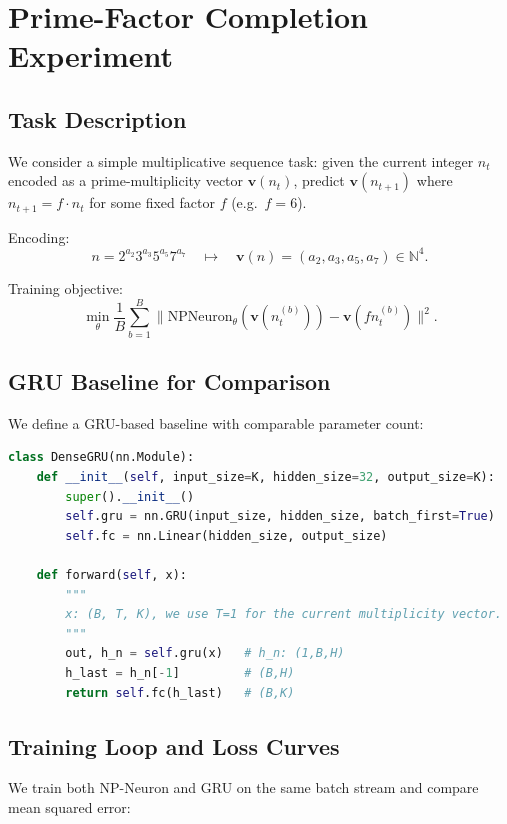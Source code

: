 \documentclass[11pt]{article}
\begin{document}
\section{Prime-Factor Completion Experiment}

\subsection{Task Description}

We consider a simple multiplicative sequence task: given the current integer \(n_t\) encoded as a prime-multiplicity vector \(\mathbf{v}(n_t)\), predict \(\mathbf{v}(n_{t+1})\) where \(n_{t+1} = f \cdot n_t\) for some fixed factor \(f\) (e.g.\ \(f=6\)).

Encoding:
\[
n = 2^{a_2} 3^{a_3} 5^{a_5} 7^{a_7}
\quad\longmapsto\quad
\mathbf{v}(n) = (a_2,a_3,a_5,a_7) \in \mathbb{N}^4.
\]

Training objective:
\[
\min_\theta \frac{1}{B}\sum_{b=1}^B
\| \mathrm{NPNeuron}_\theta(\mathbf{v}(n_t^{(b)})) - \mathbf{v}(f n_t^{(b)})\|^2.
\]

\subsection{GRU Baseline for Comparison}

We define a GRU-based baseline with comparable parameter count:

\begin{lstlisting}[language=Python,caption={GRU baseline model}]
class DenseGRU(nn.Module):
    def __init__(self, input_size=K, hidden_size=32, output_size=K):
        super().__init__()
        self.gru = nn.GRU(input_size, hidden_size, batch_first=True)
        self.fc = nn.Linear(hidden_size, output_size)

    def forward(self, x):
        """
        x: (B, T, K), we use T=1 for the current multiplicity vector.
        """
        out, h_n = self.gru(x)   # h_n: (1,B,H)
        h_last = h_n[-1]         # (B,H)
        return self.fc(h_last)   # (B,K)
\end{lstlisting}

\subsection{Training Loop and Loss Curves}

We train both NP-Neuron and GRU on the same batch stream and compare mean squared error:
\end{document}
